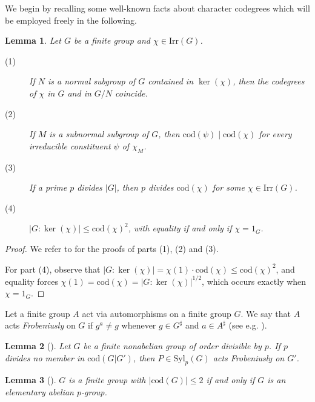 \documentclass[9pt]{article}
\newtheorem{lem}{\bf Lemma}[section]
\begin{document}
We begin by recalling some well-known facts about character codegrees which will be employed freely in the following.





\begin{lem} \label{lem: basic facts on codegree}
	Let $G$ be a finite group and $\chi\in \mathrm{Irr}(G)$.
	\begin{description}
		\item[(1)] If $N$ is a normal subgroup of $G$ contained in $\ker(\chi)$,
			then the codegrees of $\chi$ in $G$ and in $G/N$ coincide.
		\item[(2)] If $M$ is a subnormal subgroup of $G$, then $\mathrm{cod}(\psi)\mid\mathrm{cod}(\chi)$ for every irreducible constituent $\psi$ of $\chi_M$.
		\item[(3)] If a prime $p$ divides $|G|$, then $p$ divides
			$\mathrm{cod}(\chi)$ for some $\chi\in \mathrm{Irr}(G)$.
			\item[(4)] $|G:\ker(\chi)|\leq \mathrm{cod}(\chi)^{2}$, with equality if and only if 
		$\chi=1_G$.	
	\end{description}
\end{lem}
\begin{proof}
		We refer to \cite[Lemma 2.1]{liang16} for the proofs of parts (1), (2) and (3).
       
        For part (4), observe that
$|G:\ker(\chi)|=\chi(1)\cdot\mathrm{cod}(\chi)\le\mathrm{cod}(\chi)^{2}$,
and equality forces $\chi(1)=\mathrm{cod}(\chi)=|G:\ker(\chi)|^{1/2}$, which occurs exactly when $\chi=1_{G}$.
\end{proof}


Let a finite group $A$ act via automorphisms on a finite group $G$.
We say that $A$ acts \emph{Frobeniusly} on $G$ if  
$g^{a}\neq g$ whenever $g\in G^\sharp$ and $a\in A^\sharp$ (see e.g. \cite[Page 177]{isaacsgrouptheory}).


\begin{lem}[\mbox{\cite[Theorem A]{qian2007}}]\label{lem: qww}
	Let $G$ be a finite nonabelian group of order divisible by $p$.
	If  $p$ divides
	no member in $\mathrm{cod}(G|G')$, then $P\in \mathrm{Syl}_{p}(G)$ acts Frobeniusly on $G'$.
\end{lem}




\begin{lem}[\mbox{\cite[Lemma 3.1]{alizadeh2019}}]\label{lem: |codG|=2}
	$G$ is a finite group with $|\mathrm{cod}(G)|\leq 2$
	if and only if $G$ is an elementary abelian $p$-group.
\end{lem}
\end{document}

